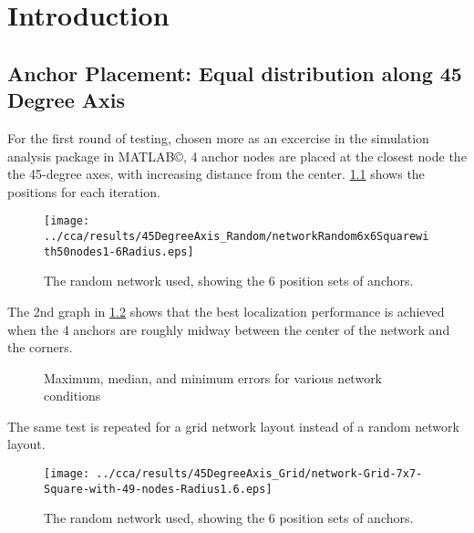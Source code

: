 \chapter{Introduction}

\section{Anchor Placement: Equal distribution along 45 Degree Axis}
For the first round of testing, chosen more as an excercise in the simulation analysis package in MATLAB\copyright, 4 anchor nodes are placed at the closest node the the 45-degree axes, with increasing distance from the center. \ref{fig:45DegreeAxisRandomNetwork} shows the positions for each iteration. 

\begin{figure}
  \centering
  \texttt{[image: ../cca/results/45DegreeAxis\_Random/networkRandom6x6Squarewith50nodes1-6Radius.eps]}\\
  \caption{The random network used, showing the 6 position sets of anchors.}
  \label{fig:45DegreeAxisRandomNetwork}
\end{figure}

The 2nd graph in \ref{fig:45DegreeAxisRandomResults} shows that the best localization performance is achieved when the 4 anchors are roughly midway between the center of the network and the corners.  

\begin{figure}
    \centerline{
      \hfil
       }
    \caption{Maximum, median, and minimum errors for various network conditions} \label{fig:45DegreeAxisRandomResults}
\end{figure}

The same test is repeated for a grid network layout instead of a random network layout.

\begin{figure}
  \centering
  \texttt{[image: ../cca/results/45DegreeAxis\_Grid/network-Grid-7x7-Square-with-49-nodes-Radius1.6.eps]}\\
  \caption{The random network used, showing the 6 position sets of anchors.}
  \label{fig:45DegreeAxisGridNetwork}
\end{figure}


